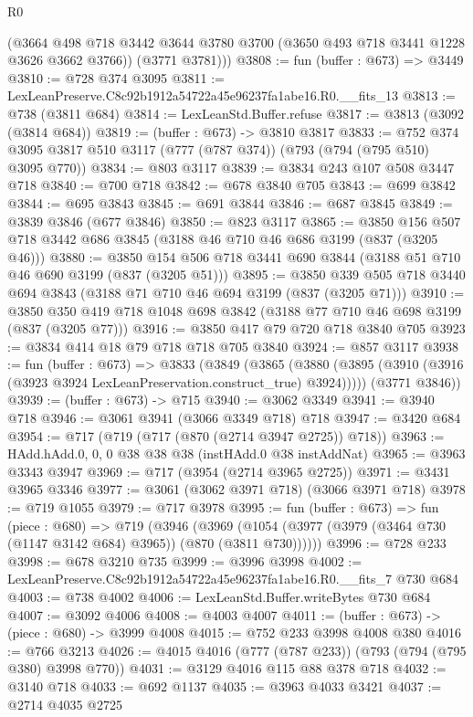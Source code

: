\begin{lexlean}{R0}
\begin{coremodule}
        (@3664 @498 @718 @3442 @3644 @3780 @3700 (@3650 @493 @718 @3441 @1228 @3626 @3662 @3766))
        (@3771 @3781)))
@3808 := fun (buffer : @673) => @3449
@3810 := @728 @374 @3095
@3811 := LexLeanPreserve.C8c92b1912a54722a45e96237fa1abe16.R0.__fits_13
@3813 := @738 (@3811 @684)
@3814 := LexLeanStd.Buffer.refuse
@3817 := @3813 (@3092 (@3814 @684))
@3819 := (buffer : @673) -> @3810 @3817
@3833 := @752 @374 @3095 @3817 @510 @3117 (@777 (@787 @374)) (@793 (@794 (@795 @510) @3095 @770))
@3834 := @803 @3117
@3839 := @3834 @243 @107 @508 @3447 @718
@3840 := @700 @718
@3842 := @678 @3840 @705
@3843 := @699 @3842
@3844 := @695 @3843
@3845 := @691 @3844
@3846 := @687 @3845
@3849 := @3839 @3846 (@677 @3846)
@3850 := @823 @3117
@3865 := @3850 @156 @507 @718 @3442 @686 @3845 (@3188 @46 @710 @46 @686 @3199 (@837 (@3205 @46)))
@3880 := @3850 @154 @506 @718 @3441 @690 @3844 (@3188 @51 @710 @46 @690 @3199 (@837 (@3205 @51)))
@3895 := @3850 @339 @505 @718 @3440 @694 @3843 (@3188 @71 @710 @46 @694 @3199 (@837 (@3205 @71)))
@3910 := @3850 @350 @419 @718 @1048 @698 @3842 (@3188 @77 @710 @46 @698 @3199 (@837 (@3205 @77)))
@3916 := @3850 @417 @79 @720 @718 @3840 @705
@3923 := @3834 @414 @18 @79 @718 @718 @705 @3840
@3924 := @857 @3117
@3938 := fun (buffer : @673) =>
  @3833
    (@3849
      (@3865 (@3880 (@3895 (@3910 (@3916 (@3923 @3924 LexLeanPreservation.construct_true) @3924)))))
      (@3771 @3846))
@3939 := (buffer : @673) -> @715
@3940 := @3062 @3349
@3941 := @3940 @718
@3946 := @3061 @3941 (@3066 @3349 @718) @718
@3947 := @3420 @684
@3954 := @717 (@719 (@717 (@870 (@2714 @3947 @2725)) @718))
@3963 := HAdd.hAdd.{0, 0, 0} @38 @38 @38 (instHAdd.{0} @38 instAddNat)
@3965 := @3963 @3343 @3947
@3969 := @717 (@3954 (@2714 @3965 @2725))
@3971 := @3431 @3965 @3346
@3977 := @3061 (@3062 @3971 @718) (@3066 @3971 @718)
@3978 := @719 @1055
@3979 := @717 @3978
@3995 := fun (buffer : @673) =>
  fun (piece : @680) =>
  @719
    (@3946
      (@3969 (@1054 (@3977 (@3979 (@3464 @730 (@1147 @3142 @684) @3965)) (@870 (@3811 @730))))))
@3996 := @728 @233
@3998 := @678 @3210 @735
@3999 := @3996 @3998
@4002 := LexLeanPreserve.C8c92b1912a54722a45e96237fa1abe16.R0.__fits_7 @730 @684
@4003 := @738 @4002
@4006 := LexLeanStd.Buffer.writeBytes @730 @684
@4007 := @3092 @4006
@4008 := @4003 @4007
@4011 := (buffer : @673) -> (piece : @680) -> @3999 @4008
@4015 := @752 @233 @3998 @4008 @380
@4016 := @766 @3213
@4026 := @4015 @4016 (@777 (@787 @233)) (@793 (@794 (@795 @380) @3998 @770))
@4031 := @3129 @4016 @115 @88 @378 @718
@4032 := @3140 @718
@4033 := @692 @1137
@4035 := @3963 @4033 @3421
@4037 := @2714 @4035 @2725

\end{coremodule}
\end{lexlean}
